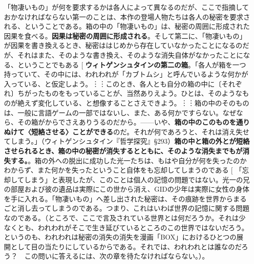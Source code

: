 \documentclass[b5j,twoside,twocolumn]{utarticle}
\makeatletter
\def\yakuchu{%
\@ifnextchar[\@xfootnote %
{\stepcounter{yakuchu}%
\protected@xdef\@thefnmark{\theyakuchu}%
\@footnotemark\@footnotetext}}
\makeatother
\begin{document}
「物凄いもの」が何を要求するかは各人によって異なるのだが、ここで指摘しておかなければならない第一のことは、本作の登場人物たちは各人の秘密を要求される、ということである。箱の中の「物凄いもの」は、秘密の周囲に形成された因果を食べる。\textbf{因果は秘密の周囲に形成される}。そして第二に、「物凄いもの」が因果を書き換えるとき、秘密ははじめから存在していなかったことになるのだが、それはまた、そのような書き換え、そのような消失自体がなかったことになる、ということでもある\yakuchu{\textbf{ウィトゲンシュタインの第二の箱}。「各人が箱を一つ持っていて、その中には、われわれが「カブトムシ」と呼んでいるような何かが入っている、と仮定しよう。︙︙このとき、各人とも自分の箱の中に〔それぞれ〕ちがったものをもっていることが、当然ありえよう。ひとは、そのようなものが絶えず変化している、と想像することさえできよう。︙︙箱の中のそのものは、一般に言語ゲームの一部ではないし、また、ある何かですらない。なぜなら、その箱がからでさえありうるのだから。------いや、\textbf{箱の中のこのものを通りぬけて〈短絡させる〉ことができる}のだ。それが何であろうと、それは消え失せてしまう。」（ウィトゲンシュタイン『哲学探究』§293）\textbf{箱の中と箱の外とが短絡させられるとき、箱の中の秘密が消失するとともに、そのような消失までもが消失する。}}。箱の外への脱出に成功した光一たちは、もはや自分が何を失ったのかわからず、また何かを失ったということ自体をも忘却してしまうのである\yakuchu{「忘却してしまう」と表現したが、このことは個人の記憶の問題ではない。光一の兄の部屋および彼の遺品は実際にこの世から消え、GIDの少年は実際に女性の身体を手に入れる。「物凄いもの」へ差し出された秘密は、その痕跡を世界からまるごと消し去ってしまうのである。つまり、これはいわば世界の記憶に関する問題なのである。（ところで、ここで言及されている世界とは何だろうか。それは少なくとも、われわれがそこで生き延びているところのこの世界ではないだろう。というのも、われわれは秘密の消失の消失を漫画「BOX」におけるひとつの展開として目の当たりにしているからである。それでは、われわれとは誰なのだろう？　この問いに答えるには、次の章を待たなければならない。）}。
\end{document}
